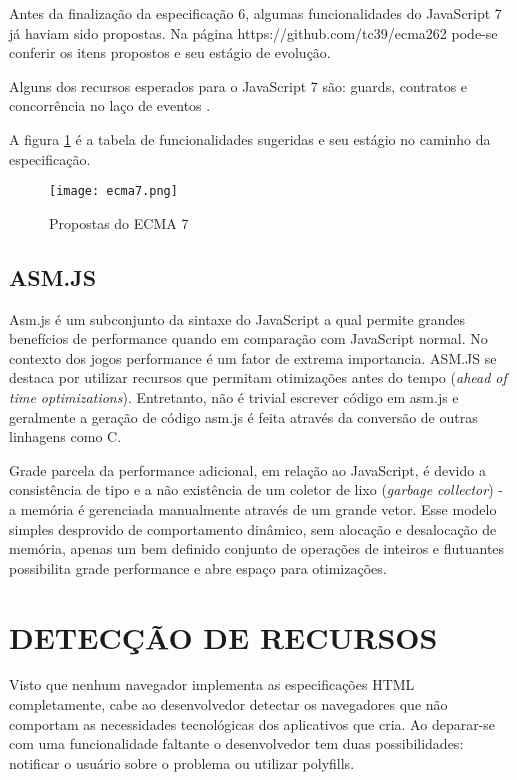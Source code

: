 Antes da finalização da especificação 6, algumas funcionalidades
do JavaScript 7 já haviam sido propostas. Na página
https://github.com/tc39/ecma262 pode-se conferir os itens propostos e
seu estágio de evolução.

Alguns dos recursos esperados para o JavaScript 7 são: guards, contratos
e concorrência no laço de eventos \autocite{ecma7}. 

A figura \ref{fig:ecma7} é a tabela de funcionalidades sugeridas e seu
estágio no caminho da especificação.

\begin{figure}
    \centering
    \texttt{[image: ecma7.png]}
	\caption{Propostas do ECMA 7}
    \label{fig:ecma7}
\end{figure}

\subsection{ASM.JS}
Asm.js é um subconjunto da sintaxe do JavaScript a qual permite grandes
benefícios de performance quando em comparação com JavaScript normal.
No contexto dos jogos performance é um fator de extrema importancia.
ASM.JS se destaca por utilizar recursos que permitam otimizações
antes do tempo (\textit{ahead of time optimizations}). Entretanto, não é
trivial escrever código em asm.js e geralmente a geração de código
asm.js é feita através da conversão de outras linhagens como C.

Grade parcela da performance adicional, em relação ao JavaScript,
é devido a consistência de tipo e a não existência de um coletor
de lixo (\textit{garbage collector}) - a memória é gerenciada
manualmente através de um grande vetor. Esse modelo simples desprovido
de comportamento dinâmico, sem alocação e desalocação de memória,
apenas um bem definido conjunto de operações de inteiros e flutuantes
possibilita grade performance e abre espaço para otimizações.

\section{DETECÇÃO DE RECURSOS}

Visto que nenhum navegador implementa as especificações HTML
completamente, cabe ao desenvolvedor detectar os navegadores que não
comportam as necessidades tecnológicas dos aplicativos que cria. Ao
deparar-se com uma funcionalidade faltante o desenvolvedor tem duas
possibilidades: notificar o usuário sobre o problema ou utilizar
polyfills.

